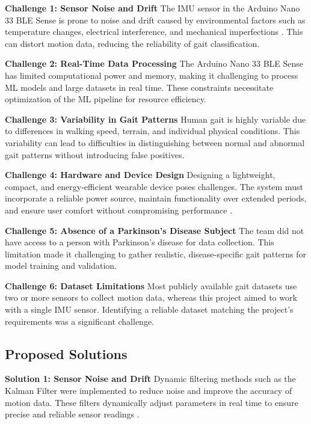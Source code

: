 \textbf{Challenge 1: Sensor Noise and Drift}  
The IMU sensor in the Arduino Nano 33 BLE Sense is prone to noise and drift caused by environmental factors such as temperature changes, electrical interference, and mechanical imperfections \cite{Bosch:2024}. This can distort motion data, reducing the reliability of gait classification.

\textbf{Challenge 2: Real-Time Data Processing}  
The Arduino Nano 33 BLE Sense has limited computational power and memory, making it challenging to process ML models and large datasets in real time. These constraints necessitate optimization of the ML pipeline for resource efficiency\cite{David:2021}.  

\textbf{Challenge 3: Variability in Gait Patterns}  
Human gait is highly variable due to differences in walking speed, terrain, and individual physical conditions. This variability can lead to difficulties in distinguishing between normal and abnormal gait patterns without introducing false positives\cite{Hausdorff:2009}. 

\textbf{Challenge 4: Hardware and Device Design}  
Designing a lightweight, compact, and energy-efficient wearable device poses challenges. The system must incorporate a reliable power source, maintain functionality over extended periods, and ensure user comfort without compromising performance \cite{ArduinoNano33Sense2025}.

\textbf{Challenge 5: Absence of a Parkinson’s Disease Subject}  
The team did not have access to a person with Parkinson’s disease for data collection. This limitation made it challenging to gather realistic, disease-specific gait patterns for model training and validation.

\textbf{Challenge 6: Dataset Limitations}  
Most publicly available gait datasets use two or more sensors to collect motion data, whereas this project aimed to work with a single IMU sensor. Identifying a reliable dataset matching the project’s requirements was a significant challenge.

\subsection{Proposed Solutions}

\textbf{Solution 1: Sensor Noise and Drift}  
Dynamic filtering methods such as the Kalman Filter were implemented to reduce noise and improve the accuracy of motion data. These filters dynamically adjust parameters in real time to ensure precise and reliable sensor readings \cite{Kalman:2012}.

